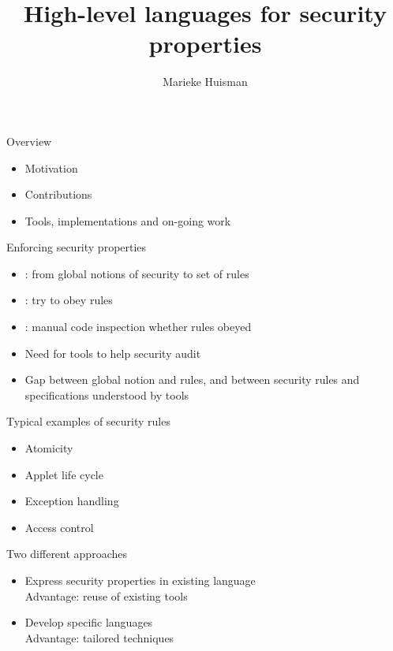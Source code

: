\documentclass[final,nocolorBG,a4,marieke,nototal,ps, accumulate,slideColor]{prosper}
\title{High-level languages for security properties}
\subtitle{}
\author{Marieke Huisman}
\begin{document}
 

\maketitle

\begin{slide}{Overview}
\begin{itemize}
\item Motivation
\item Contributions
\item Tools, implementations and on-going work
\end{itemize}
\end{slide}

\begin{slide}{Enforcing security properties}
\begin{itemize}
\item {}: from global notions of security to set
of rules
\item {}: try to obey rules
\item {}: manual code inspection whether rules
obeyed
\item Need for tools to help security audit
\item Gap between global notion and rules, and between security rules
and specifications understood by tools 
\end{itemize}
\end{slide}


\begin{slide}{Typical examples of security rules}
\begin{itemize}
  \item Atomicity \item Applet life cycle \item Exception handling
  \item Access control
\end{itemize}
\end{slide}


\begin{slide}{Two different approaches}
\begin{itemize}
\item Express security properties in existing language\\
Advantage: reuse of existing tools
\item Develop specific languages\\
Advantage: tailored techniques
\end{itemize}
\end{slide}
\end{document}
